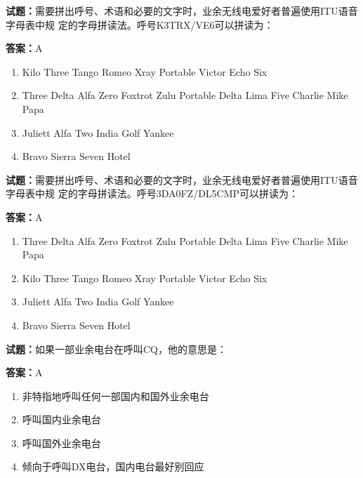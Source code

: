 \documentclass{ctexbook}
\begin{document}
\textbf{试题：}需要拼出呼号、术语和必要的文字时，业余无线电爱好者普遍使用ITU语音字母表中规
定的字母拼读法。呼号K3TRX/VE6可以拼读为： 

\textbf{答案：}A 

\begin{enumerate}[leftmargin=3em]
  \item Kilo Three Tango Romeo Xray Portable Victor Echo Six 

  \item Three Delta Alfa Zero Foxtrot Zulu Portable Delta Lima Five Charlie Mike Papa 

  \item Juliett Alfa Two India Golf Yankee 


  \item Bravo Sierra Seven Hotel 

\end{enumerate}





\vspace{1em}

\textbf{试题：}需要拼出呼号、术语和必要的文字时，业余无线电爱好者普遍使用ITU语音字母表中规
定的字母拼读法。呼号3DA0FZ/DL5CMP可以拼读为： 

\textbf{答案：}A 

\begin{enumerate}[leftmargin=3em]
  \item Three Delta Alfa Zero Foxtrot Zulu Portable Delta Lima Five Charlie Mike Papa 

  \item Kilo Three Tango Romeo Xray Portable Victor Echo Six 

  \item Juliett Alfa Two India Golf Yankee 

  \item Bravo Sierra Seven Hotel 

\end{enumerate}





\vspace{1em}

\textbf{试题：}如果一部业余电台在呼叫CQ，他的意思是： 

\textbf{答案：}A 

\begin{enumerate}[leftmargin=3em]
  \item 非特指地呼叫任何一部国内和国外业余电台 

  \item 呼叫国内业余电台 

  \item 呼叫国外业余电台 

  \item 倾向于呼叫DX电台，国内电台最好别回应 

\end{enumerate}
\end{document}
